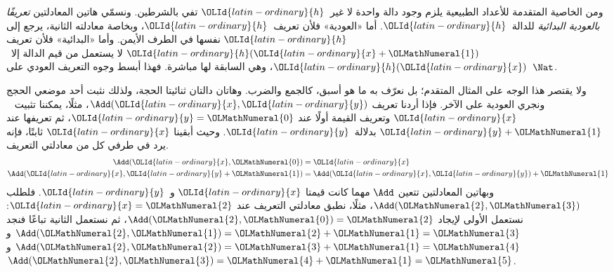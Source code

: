 \documentclass[../../../include/open-logic-section]{subfiles}
\begin{document}
ومن الخاصية المتقدمة للأعداد الطبيعية يلزم وجود دالة واحدة لا غير~$\OLId{latin-ordinary}{h}$ تفي
بالشرطين. ونسمّي هاتين المعادلتين \emph{تعريفًا بالعودية
البدائية} للدالة~$\OLId{latin-ordinary}{h}$. أما «العودية» فلأن تعريف~$\OLId{latin-ordinary}{h}$، وبخاصة معادلته
الثانية، يرجع إلى $\OLId{latin-ordinary}{h}$ نفسها في الطرف الأيمن. وأما «البدائية» فلأن
تعريف $\OLId{latin-ordinary}{h}(\OLId{latin-ordinary}{x}+\OLMathNumeral{1})$ لا يستعمل من قيم الدالة إلا~$\OLId{latin-ordinary}{h}(\OLId{latin-ordinary}{x})$، وهي السابقة لها مباشرة.
فهذا أبسط وجوه التعريف العودي على~$\Nat$.

ولا يقتصر هذا الوجه على المثال المتقدم؛ بل نعرّف به ما هو أسبق، كالجمع والضرب.
وهاتان دالتان ثنائيتا الحجة، ولذلك نثبت أحد موضعي
الحجج ونجري العودية على الآخر. فإذا أردنا تعريف $\Add(\OLId{latin-ordinary}{x},\OLId{latin-ordinary}{y})$، مثلًا، يمكننا تثبيت
~$\OLId{latin-ordinary}{x}$ وتعريف القيمة أولًا عند $\OLId{latin-ordinary}{y}=\OLMathNumeral{0}$، ثم تعريفها عند $\OLId{latin-ordinary}{y}+\OLMathNumeral{1}$ بدلالة~$\OLId{latin-ordinary}{y}$.
وحيث أبقينا $\OLId{latin-ordinary}{x}$ ثابتًا، فإنه يرد في طرفي كل من معادلتي التعريف.
\begin{align*}
\Add(\OLId{latin-ordinary}{x},\OLMathNumeral{0}) & =  \OLId{latin-ordinary}{x}\\
\Add(\OLId{latin-ordinary}{x},\OLId{latin-ordinary}{y}+\OLMathNumeral{1}) & =  \Add(\OLId{latin-ordinary}{x},\OLId{latin-ordinary}{y})+\OLMathNumeral{1}
\end{align*}
وبهاتين المعادلتين تتعين $\Add$ مهما كانت قيمتا $\OLId{latin-ordinary}{x}$ و~$\OLId{latin-ordinary}{y}$. فلطلب
$\Add(\OLMathNumeral{2},\OLMathNumeral{3})$، مثلًا، نطبق معادلتي التعريف عند $\OLId{latin-ordinary}{x}=\OLMathNumeral{2}$: نستعمل الأولى
لإيجاد $\Add(\OLMathNumeral{2},\OLMathNumeral{0})=\OLMathNumeral{2}$، ثم نستعمل الثانية تباعًا فنجد
$\Add(\OLMathNumeral{2},\OLMathNumeral{1})=\OLMathNumeral{2}+\OLMathNumeral{1}=\OLMathNumeral{3}$ و$\Add(\OLMathNumeral{2},\OLMathNumeral{2})=\OLMathNumeral{3}+\OLMathNumeral{1}=\OLMathNumeral{4}$ و$\Add(\OLMathNumeral{2},\OLMathNumeral{3})=\OLMathNumeral{4}+\OLMathNumeral{1}=\OLMathNumeral{5}$.
\end{document}
